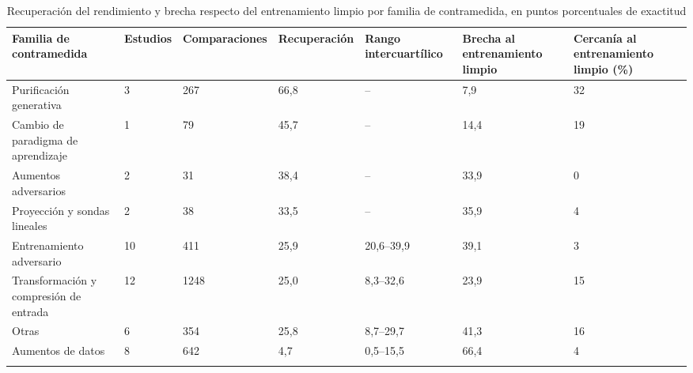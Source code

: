 \begin{table}[t]
\caption{Recuperación del rendimiento y brecha respecto del entrenamiento limpio por familia de contramedida, en puntos porcentuales de exactitud}\label{tab:familias}
\footnotesize
\begin{tabularx}{\textwidth}{@{}L{3.0cm}*{6}{Z{1.0}}@{}}
\toprule
Familia de contramedida & Estudios & Comparaciones & Recuperación & Rango intercuartílico & Brecha al entrenamiento limpio & Cercanía al entrenamiento limpio (\%) \\
\midrule
Purificación generativa & 3 & 267 & 66,8 & -- & 7,9 & 32 \\
Cambio de paradigma de aprendizaje & 1 & 79 & 45,7 & -- & 14,4 & 19 \\
Aumentos adversarios & 2 & 31 & 38,4 & -- & 33,9 & 0 \\
Proyección y sondas lineales & 2 & 38 & 33,5 & -- & 35,9 & 4 \\
Entrenamiento adversario & 10 & 411 & 25,9 & 20,6--39,9 & 39,1 & 3 \\
Transformación y compresión de entrada & 12 & 1248 & 25,0 & 8,3--32,6 & 23,9 & 15 \\
Otras & 6 & 354 & 25,8 & 8,7--29,7 & 41,3 & 16 \\
Aumentos de datos & 8 & 642 & 4,7 & 0,5--15,5 & 66,4 & 4 \\
\botrule
\end{tabularx}
\end{table}
